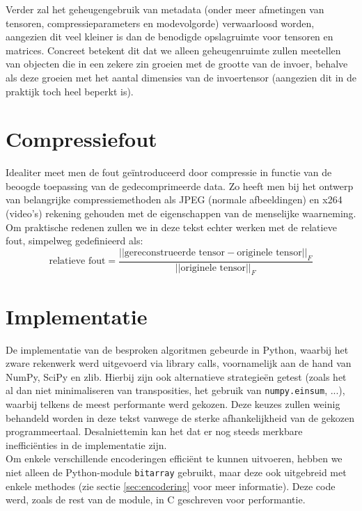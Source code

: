 Verder zal het geheugengebruik van metadata (onder meer afmetingen van tensoren, compressieparameters en modevolgorde) verwaarloosd worden, aangezien dit veel kleiner is dan de benodigde opslagruimte voor tensoren en matrices. Concreet betekent dit dat we alleen geheugenruimte zullen meetellen van objecten die in een zekere zin groeien met de grootte van de invoer, behalve als deze groeien met het aantal dimensies van de invoertensor (aangezien dit in de praktijk toch heel beperkt is).

\section{Compressiefout}

Idealiter meet men de fout ge\"introduceerd door compressie in functie van de beoogde toepassing van de gedecomprimeerde data. Zo heeft men bij het ontwerp van belangrijke compressiemethoden als JPEG \cite{ref:jpeg} (normale afbeeldingen) en x264 \cite{ref:x264} (video's) rekening gehouden met de eigenschappen van de menselijke waarneming. Om praktische redenen zullen we in deze tekst echter werken met de relatieve fout, simpelweg gedefinieerd als:
\[
\text{relatieve fout} = \frac{||\text{gereconstrueerde tensor} - \text{originele tensor}||_F}{||\text{originele tensor}||_F}
\]

\section{Implementatie}

De implementatie van de besproken algoritmen gebeurde in Python, waarbij het zware rekenwerk werd uitgevoerd via library calls, voornamelijk aan de hand van NumPy, SciPy en zlib. Hierbij zijn ook alternatieve strategie\"en getest (zoals het al dan niet minimaliseren van transposities, het gebruik van \texttt{numpy.einsum}, ...), waarbij telkens de meest performante werd gekozen. Deze keuzes zullen weinig behandeld worden in deze tekst vanwege de sterke afhankelijkheid van de gekozen programmeertaal. Desalniettemin kan het dat er nog steeds merkbare ineffici\"enties in de implementatie zijn.\\

Om enkele verschillende encoderingen effici\"ent te kunnen uitvoeren, hebben we niet alleen de Python-module \texttt{bitarray} \cite{ref:bitarray} gebruikt, maar deze ook uitgebreid met enkele methodes (zie sectie \ref{sec:encodering} voor meer informatie). Deze code werd, zoals de rest van de module, in C geschreven voor performantie.\\


